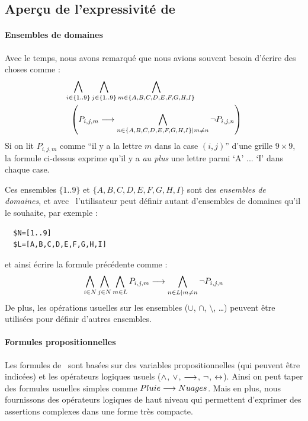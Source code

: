 \subsection{Aperçu de l'expressivité de \nameTool\label{sec:sat_tobedone}}

\paragraph{Ensembles de domaines}
Avec le temps, nous avons remarqué que nous avions souvent besoin d'écrire des choses comme :
$$\begin{aligned}\bigwedge_{i \in \{1..9\}} \bigwedge_{j \in \{1..9\}}\bigwedge_{ m\in \{A,B,C,D,E,F,G,H,I\}} \hspace{2cm}\\ \left( P_{i,j,m}\longrightarrow \bigwedge_{n \in \{A,B,C,D,E,F,G,H,I\}|m\neq n}\neg P_{i,j,n}\right)\end{aligned}$$
Si on lit $P_{i,j,m}$ comme  ``il y a la lettre $m$ dans la case $(i,j)$'' d'une grille $9\times 9$, la formule ci-dessus exprime qu'il y a \emph{au plus} une lettre parmi `A' ... `I' dans chaque case.

Ces ensembles $\{1..9\}$ et $\{A,B,C,D,E,F,G,H,I\}$ sont des \emph{ensembles de domaines}, et avec \nameTool\ l'utilisateur peut définir autant d'ensembles de domaines qu'il le souhaite, par exemple :

\begin{verbatim}
  $N=[1..9]
  $L=[A,B,C,D,E,F,G,H,I]
\end{verbatim}

et ainsi écrire la formule précédente comme :
$$\bigwedge_{i \in N} \bigwedge_{j \in N}\bigwedge_{ m\in L}P_{i,j,m}\longrightarrow \bigwedge_{n \in L|m\neq n}\neg P_{i,j,n}$$
De plus, les opérations usuelles sur les ensembles ($\cup$, $\cap$, $\setminus$, \ldots) peuvent être utilisées pour définir d'autres ensembles.


\paragraph{Formules propositionnelles}

Les formules de \nameTool\ sont basées sur des variables propositionnelles (qui peuvent être indicées) et les opérateurs logiques usuels ($\wedge$, $\vee$, $\longrightarrow$, $\neg$, $\leftrightarrow$). Ainsi on peut taper des formules usuelles simples comme $Pluie \longrightarrow Nuages$. Mais en plus, nous fournissons des opérateurs logiques de haut niveau qui permettent d'exprimer des assertions complexes dans une forme très compacte.

